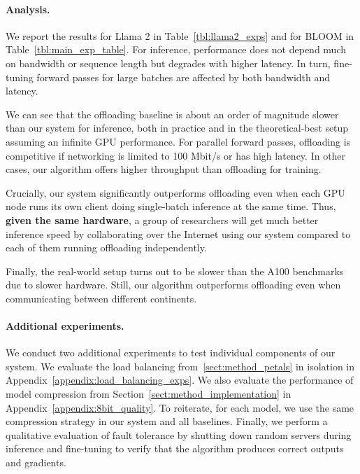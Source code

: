 \paragraph{Analysis.} We report the results for Llama 2 in Table~\ref{tbl:llama2_exps} and for BLOOM in Table~\ref{tbl:main_exp_table}. For inference, performance does not depend much on bandwidth or sequence length but degrades with higher latency. In turn, fine-tuning forward passes for large batches are affected by both bandwidth and latency.

We can see that the offloading baseline is about an order of magnitude slower than our system for inference, both in practice and in the theoretical-best setup assuming an infinite GPU performance. For parallel forward passes, offloading is competitive if networking is limited to 100 Mbit/s or has high latency. In other cases, our algorithm offers higher throughput than offloading for training.

Crucially, our system significantly outperforms offloading even when each GPU node runs its own client doing single-batch inference at the same time. Thus, \textbf{given the same hardware}, a group of researchers will get much better inference speed by collaborating over the Internet using our system compared to each of them running offloading independently.

Finally, the real-world setup turns out to be slower than the A100 benchmarks due to slower hardware. Still, our algorithm outperforms offloading even when communicating between different continents.


\paragraph{Additional experiments.} We conduct two additional experiments to test individual components of our system. We evaluate the load balancing from~\ref{sect:method_petals} in isolation in Appendix~\ref{appendix:load_balancing_exps}. We also evaluate the performance of model compression from Section~\ref{sect:method_implementation} in Appendix~\ref{appendix:8bit_quality}. To reiterate, for each model, we use the same compression strategy in our system and all baselines. Finally, we perform a qualitative evaluation of fault tolerance by shutting down random servers during inference and fine-tuning to verify that the algorithm produces correct outputs and gradients.